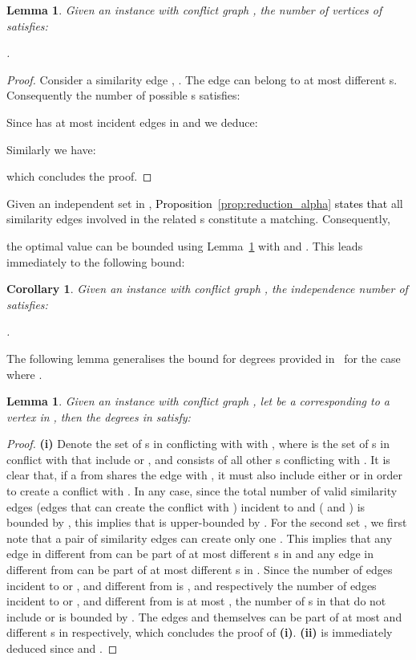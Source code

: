 \documentclass[final]{dmtcs-episciences}
\newtheorem{lemma}[theorem]{Lemma}
\newtheorem{corollary}[theorem]{Corollary}
\newcommand\mar[1]{\textcolor{black}{#1}}
\begin{document}
\begin{lemma}
\label{vertexlemma}
Given an instance  with conflict graph , the number  of vertices of  satisfies:\\ 
{\centerline{.}}
\end{lemma}
\begin{proof}
Consider a similarity edge , .  
The edge  can belong to at most  different s. Consequently the number of possible  s satisfies: 

Since  has at most  incident edges in  and  we deduce:  
 

Similarly we have:
 
which concludes the proof.
\end{proof}


Given an independent set in , \mar{Proposition~\ref{prop:reduction_alpha} states that} all similarity edges involved in the related s constitute a matching. Consequently, 

the optimal value  can be bounded using Lemma~\ref{vertexlemma} with  and . This leads immediately to the following bound:


\begin{corollary}\label{cor:alpha}
Given an instance  with conflict graph , the independence number of   satisfies:\\ 
{\centerline{.}}
\end{corollary}

The following lemma generalises the 
bound for degrees provided in~\citet{Fertin200990} for the case where .


\begin{lemma}
\label{deglemma}
Given an instance  with conflict graph , let  be a  corresponding to a vertex  in  , then the degrees in  satisfy:

\noindent

\end{lemma}
\begin{proof} 
\textbf{(i)}
Denote the set of 
s in  
conflicting with  
with , where  is the set of s in conflict with  that include  or , and  consists of all other s conflicting with .  
It is clear that, if a  from  shares the edge  with , it must also include either  or  in order to create a conflict with . In any case, since the total number of valid similarity edges (edges that can create the conflict with ) incident to  and  ( and ) is bounded by , this implies that  is upper-bounded by . 
For the second set , we first note that a pair of similarity edges can create only one . 
This implies that any edge in 
different from 
can be part of at most  different s in  and any edge in  different from  can be part of at most 
different s in .
Since the number of  edges incident to  or , and different from  is 
 , and respectively the number of  edges incident to  or , and different from  is 
at most , the number of s in  that do not include  or 
is bounded by .
The edges  and  themselves can be part of at most  and  different s in  respectively, which concludes the proof of \textbf{(i)}. \textbf{(ii)} is immediately deduced since   and .
\end{proof}
\end{document}
